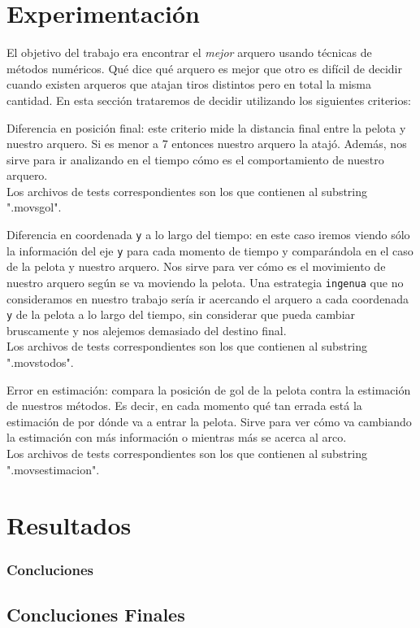 \section{Experimentación}
El objetivo del trabajo era encontrar el \textit{mejor} arquero usando técnicas de métodos
numéricos. Qué dice qué arquero es mejor que otro es difícil de decidir cuando existen arqueros que
atajan tiros distintos pero en total la misma cantidad. En esta sección trataremos de decidir
utilizando los siguientes criterios:
\begin{compactitem}
  \item Diferencia en posición final: este criterio mide la distancia final entre la pelota y
    nuestro arquero. Si es menor a 7 entonces nuestro arquero la atajó. Además, nos sirve para ir
    analizando en el tiempo cómo es el comportamiento de nuestro arquero. \\
    Los archivos de tests correspondientes son los que contienen al substring ".movsgol".
  \item Diferencia en coordenada \texttt{y} a lo largo del tiempo: en este caso iremos viendo sólo la
    información del eje \texttt{y} para cada momento de tiempo y comparándola en el caso de la pelota
    y nuestro arquero. Nos sirve para ver cómo es el movimiento de nuestro arquero según se va
    moviendo la pelota. Una estrategia \texttt{ingenua} que no consideramos en nuestro trabajo sería
    ir acercando el arquero a cada coordenada \texttt{y} de la pelota a lo largo del tiempo, sin
    considerar que pueda cambiar bruscamente y nos alejemos demasiado del destino final.
    \\
    Los archivos de tests correspondientes son los que contienen al substring ".movstodos".
  \item Error en estimación: compara la posición de gol de la pelota contra la estimación de
    nuestros métodos. Es decir, en cada momento qué tan errada está la estimación de por dónde va a
    entrar la pelota. Sirve para ver cómo va cambiando la estimación con más información o mientras
    más se acerca al arco.
    \\
   Los archivos de tests correspondientes son los que contienen al substring ".movsestimacion".
 \end{compactitem}


\section{Resultados}



\subsubsection{Concluciones}

\subsection{Concluciones Finales}
